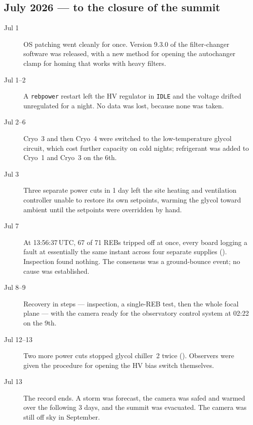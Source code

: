 \subsection{July 2026 --- to the closure of the summit}
\begin{description}

\item[Jul 1] OS patching went cleanly for once.  Version 9.3.0 of the
  filter-changer software was released, with a new method for opening
  the autochanger clamp for homing that works with heavy filters.

\item[Jul 1--2] A \texttt{rebpower} restart left the HV regulator in
  \texttt{IDLE} and the voltage drifted unregulated for a night.  No
  data was lost, because none was taken.

\item[Jul 2--6] Cryo~3 and then Cryo~4 were switched to the
  low-temperature glycol circuit, which cost further capacity on cold
  nights; refrigerant was added to Cryo~1 and Cryo~3 on the 6th.

\item[Jul 3] Three separate power cuts in 1 day left the site
  heating and ventilation controller unable to restore its own
  setpoints, warming the glycol toward ambient until the setpoints were
  overridden by hand.

\item[Jul 7] At 13:56:37\,UTC, 67 of 71 REBs tripped off at once,
  every board logging a fault at essentially the same instant across
  four separate supplies ().  Inspection found
  nothing.  The consensus was a ground-bounce event; no cause was
  established.

\item[Jul 8--9] Recovery in steps --- inspection, a single-REB test,
  then the whole focal plane --- with the camera ready for the
  observatory control system at 02:22 on the 9th.

\item[Jul 12--13] Two more power cuts stopped glycol chiller~2 twice
  ().  Observers were given the procedure for
  opening the HV bias switch themselves.

\item[Jul 13] The record ends.  A storm was forecast, the camera was
  safed and warmed over the following 3 days, and the summit was
  evacuated.  The camera was still off sky in September.

\end{description}

